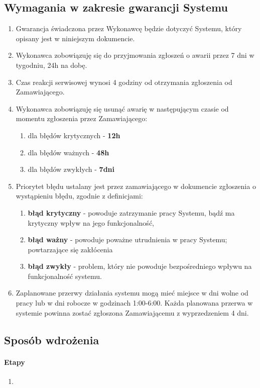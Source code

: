 \documentclass{article}
\begin{document}
\subsection{Wymagania w zakresie gwarancji Systemu}
\begin{enumerate}
	\item Gwarancja świadczona przez Wykonawcę będzie dotyczyć Systemu, który opisany jest w niniejszym dokumencie.
	\item Wykonawca zobowiązuję się do przyjmowania zgłoszeń o awarii przez 7 dni w tygodniu, 24h na dobę.
	\item Czas reakcji serwisowej wynosi 4 godziny od otrzymania zgłoszenia od Zamawiającego.
	\item Wykonawca zobowiązuję się usunąć awarię w następującym czasie od momentu zgłoszenia przez Zamawiającego:
	\begin{enumerate}
		\item dla błędów krytycznych - \textbf{12h}
		\item dla błędów ważnych - \textbf{48h} 
		\item dla błędów zwykłych - \textbf{7dni}
	\end{enumerate}

	\item Priorytet błędu ustalany jest przez zamawiającego w dokumencie zgłoszenia o wystąpieniu błędu, zgodnie z definicjami:
	\begin{enumerate}
		\item \textbf{błąd krytyczny} - powoduje zatrzymanie pracy Systemu, bądź ma krytyczny wpływ na jego funkcjonalność,
		\item \textbf{błąd ważny} - powoduje poważne utrudnienia w pracy Systemu; powtarzające się zakłócenia
		\item \textbf{błąd zwykły} - problem, który nie powoduje bezpośredniego wpływu na funkcjonalność systemu.
	\end{enumerate}

	\item Zaplanowane przerwy działania systemu mogą mieć miejsce w dni wolne od pracy lub w dni robocze w godzinach 1:00-6:00. Każda planowana przerwa w systemie powinna zostać zgłoszona Zamawiającemu z wyprzedzeniem 4 dni.
	
\end{enumerate}
\subsection{Sposób wdrożenia}
\paragraph{Etapy}
\begin{enumerate}
\item 
\end{enumerate}
\end{document}
